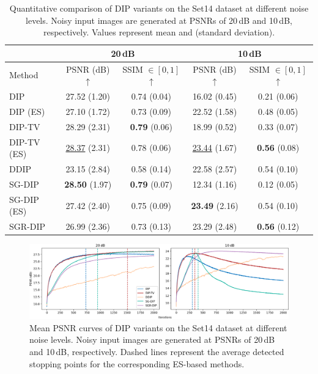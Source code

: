 \begin{table}
    \small
    \centering
    \begin{tabular}{ l c c c c }
        \toprule
        &\multicolumn{2}{c}{20\,dB} &\multicolumn{2}{c}{10\,dB}\\
        \midrule
        Method &PSNR (dB) $\uparrow$ &SSIM $\in [0,1]$ $\uparrow$ &PSNR (dB) $\uparrow$ &SSIM $\in [0,1]$ $\uparrow$\\
        \midrule
        DIP &27.52 {\scriptsize (1.20)} &0.74 {\scriptsize (0.04)} &16.02 {\scriptsize (0.45)} &0.21 {\scriptsize (0.06)} \\
        DIP (ES) &27.10 {\scriptsize (1.72)} &0.73 {\scriptsize (0.09)} &22.52 {\scriptsize (1.58)} &0.48 {\scriptsize (0.05)} \\
        DIP-TV &28.29 {\scriptsize (2.31)} &\textbf{0.79} {\scriptsize (0.06)} &18.99 {\scriptsize (0.52)} &0.33 {\scriptsize (0.07)} \\
        DIP-TV (ES) &\underline{28.37} {\scriptsize (2.31)} &0.78 {\scriptsize (0.06)} &\underline{23.44} {\scriptsize (1.67)} &\textbf{0.56} {\scriptsize (0.08)} \\
        DDIP &23.15 {\scriptsize (2.84)} &0.58 {\scriptsize (0.14)} &22.58 {\scriptsize (2.57)} &0.54 {\scriptsize (0.10)} \\
        SG-DIP &\textbf{28.50} {\scriptsize (1.97)} &\textbf{0.79} {\scriptsize (0.07)} &12.34 {\scriptsize (1.16)} &0.12 {\scriptsize (0.05)} \\
        SG-DIP (ES) &27.42 {\scriptsize (2.40)} &0.75 {\scriptsize (0.09)} &\textbf{23.49} {\scriptsize (2.16)} &0.54 {\scriptsize (0.10)} \\
        SGR-DIP &26.99 {\scriptsize (2.36)} &0.73 {\scriptsize (0.13)} &23.29 {\scriptsize (2.48)} &\textbf{0.56} {\scriptsize (0.12)} \\
        \bottomrule
    \end{tabular}
    \caption{
        Quantitative comparison of DIP variants on the Set14 dataset at different noise levels.
        Noisy input images are generated at PSNRs of 20\,dB and 10\,dB, respectively.
        Values represent mean and {\scriptsize (standard deviation)}.
    }\label{tab:noise-levels}
\end{table}

\begin{figure}
    \centering
    \includegraphics[width=\textwidth]{img/fig_6.1.png}
    \caption{
        Mean PSNR curves of DIP variants on the Set14 dataset at different noise levels.
        Noisy input images are generated at PSNRs of 20\,dB and 10\,dB, respectively.
        Dashed lines represent the average detected stopping points for the corresponding ES-based methods.
    }\label{fig:noise-levels}
\end{figure}

